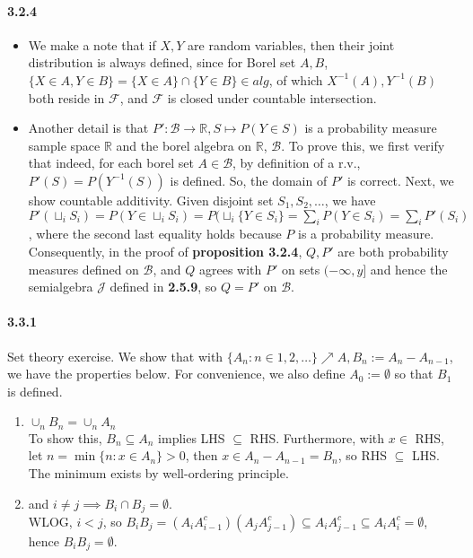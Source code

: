 \documentclass[a4paper]{article}
\newcommand{\alg}[0]{\mathcal{F}} %
\newcommand{\borel}[0]{\mathcal{B}} %
\newcommand{\semialg}[0]{\mathcal{J}} %
\newcommand{\real}[0]{\mathbb{R}} %
\newcommand{\infseq}[1]{#1_1,#1_2,\dots} %
\begin{document}
\paragraph{3.2.4} 
\begin{itemize} 
	\item We make a note that if $X, Y$ are random variables, then their joint distribution is always defined, since for Borel set $A, B$, $\{X\in A, Y\in B\} = \{X\in A\}\cap \{Y\in B\}\in alg$, of which $X^{-1}(A), Y^{-1}(B)$ both reside in $\alg$, and $\alg$ is closed under countable intersection.
	\item Another detail is that $P':\borel\rightarrow\real,S\mapsto P(Y\in S)$ is a probability measure sample space $\real$ and the borel algebra on $\real$, $\borel$. To prove this, we first verify that indeed, for each borel set $A\in\borel$, by definition of a r.v., $P'(S) = P(Y^{-1}(S))$ is defined. So, the domain of $P'$ is correct. Next, we show countable additivity. Given disjoint set $\infseq{S}$, we have $P'(\sqcup_i S_i) = P(Y\in \sqcup_i S_i) = P(\sqcup_i \{Y\in S_i\} = \sum_i P(Y\in S_i) = \sum_i P'(S_i)$, where the second last equality holds because $P$ is a probability measure.\\
	Consequently, in the proof of \textbf{proposition 3.2.4}, $Q,P'$ are both probability measures defined on $\borel$, and $Q$ agrees with $P'$ on sets $(-\infty,y]$ and hence the semialgebra $\semialg$ defined in \textbf{2.5.9}, so $Q=P'$ on $\borel$.
\end{itemize}

\paragraph{3.3.1} Set theory exercise. We show that with $\{A_n : n\in 1,2,\dots\}\nearrow A, B_n := A_n-A_{n-1}$, we have the properties below. For convenience, we also define $A_0:=\emptyset$ so that $B_1$ is defined.
\begin{enumerate}
	\item $\cup_n B_n = \cup_n A_n$\\
	To show this, $B_n\subseteq A_n$ implies LHS $\subseteq$ RHS. Furthermore, with $x\in$ RHS, let $n = \min \{n : x\in A_n\} > 0$, then $x\in A_n-A_{n-1} = B_n$, so RHS $\subseteq$ LHS. The minimum exists by well-ordering principle.
	\item and $i\neq j\implies B_i\cap B_j = \emptyset$.\\
	WLOG, $i < j$, so $B_iB_j = (A_iA_{i-1}^c)(A_jA_{j-1}^c)\subseteq A_iA_{j-1}^c\subseteq A_iA_i^c = \emptyset$, hence $B_iB_j=\emptyset$.
\end{enumerate}
\end{document}
